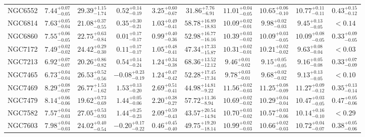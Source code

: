 \documentclass[onecolumn]{mn2e}
\begin{document}
\begin{landscape}
{\begin{center}
\begin{longtable}{lccccccccc}
NGC6552 & $7.44_{-0.05}^{+0.07}$ & $29.39_{-1.74}^{+1.15}$ & $0.52_{-0.19}^{+0.14}$ & $3.25_{-0.67}^{+0.60}$ &$31.86_{-6.91}^{+7.76}$ & $11.01_{-0.05}^{+0.04}$ & $10.65_{-0.10}^{+0.06}$ & $10.77_{-0.11}^{+0.11}$ & $0.43_{-0.12}^{+0.15}$ \\
NGC6814 & $7.63_{-0.04}^{+0.05}$ & $21.08_{-0.55}^{+0.37}$ & $0.35_{-0.21}^{+0.30}$ & $1.03_{-0.41}^{+0.49}$ &$58.78_{-18.83}^{+16.89}$ & $10.09_{-0.01}^{+0.02}$ & $9.98_{-0.03}^{+0.02}$ & $9.45_{-0.05}^{+0.13}$ & $<0.14$ \\
NGC6860 & $7.55_{-0.05}^{+0.06}$ & $22.75_{-0.84}^{+0.63}$ & $0.01_{-0.17}^{+0.17}$ & $0.99_{-0.36}^{+0.40}$ &$52.98_{-16.16}^{+16.77}$ & $10.39_{-0.02}^{+0.03}$ & $10.09_{-0.05}^{+0.03}$ & $10.09_{-0.05}^{+0.08}$ & $0.33_{-0.05}^{+0.09}$ \\
NGC7172 & $7.49_{-0.02}^{+0.02}$ & $24.42_{-0.30}^{+0.29}$ & $0.11_{-0.17}^{+0.17}$ & $1.05_{-0.41}^{+0.48}$ &$47.34_{-15.87}^{+17.33}$ & $10.31_{-0.01}^{+0.02}$ & $10.21_{-0.02}^{+0.02}$ & $9.63_{-0.04}^{+0.08}$ & $<0.03$ \\
NGC7213 & $6.92_{-0.07}^{+0.07}$ & $20.26_{-0.82}^{+0.86}$ & $0.54_{-0.24}^{+0.14}$ & $1.24_{-0.38}^{+0.34}$ &$68.36_{-12.12}^{+13.52}$ & $9.46_{-0.02}^{+0.01}$ & $9.15_{-0.05}^{+0.05}$ & $9.16_{-0.08}^{+0.05}$ & $0.33_{-0.09}^{+0.07}$ \\
NGC7465 & $6.73_{-0.04}^{+0.04}$ & $26.53_{-0.56}^{+0.52}$ & $-0.08_{-0.19}^{+0.23}$ & $1.24_{-0.42}^{+0.47}$ &$52.28_{-17.34}^{+17.45}$ & $9.78_{-0.01}^{+0.03}$ & $9.68_{-0.02}^{+0.02}$ & $9.13_{-0.05}^{+0.13}$ & $<0.10$ \\
NGC7469 & $8.29_{-0.07}^{+0.08}$ & $26.77_{-1.62}^{+1.53}$ & $1.53_{-0.20}^{+0.13}$ & $2.69_{-0.41}^{+0.51}$ &$44.98_{-9.22}^{+14.81}$ & $11.56_{-0.03}^{+0.02}$ & $11.25_{-0.09}^{+0.08}$ & $11.27_{-0.12}^{+0.09}$ & $0.35_{-0.14}^{+0.13}$ \\
NGC7479 & $8.14_{-0.06}^{+0.06}$ & $19.62_{-0.69}^{+0.73}$ & $1.44_{-0.06}^{+0.05}$ & $2.20_{-0.27}^{+0.38}$ &$57.72_{-8.94}^{+11.36}$ & $10.69_{-0.02}^{+0.02}$ & $10.29_{-0.04}^{+0.04}$ & $10.47_{-0.05}^{+0.03}$ & $0.47_{-0.06}^{+0.05}$ \\
NGC7582 & $7.57_{-0.03}^{+0.04}$ & $27.05_{-0.93}^{+0.53}$ & $1.44_{-0.23}^{+0.25}$ & $2.09_{-0.43}^{+0.59}$ &$43.57_{-14.94}^{+20.54}$ & $10.70_{-0.02}^{+0.03}$ & $10.57_{-0.06}^{+0.03}$ & $10.14_{-0.10}^{+0.16}$ & $<0.29$ \\
NGC7603 & $7.98_{-0.03}^{+0.04}$ & $24.02_{-0.54}^{+0.40}$ & $-0.20_{-0.22}^{+0.17}$ & $0.46_{-0.40}^{+0.45}$ &$49.75_{-18.14}^{+19.20}$ & $10.99_{-0.03}^{+0.02}$ & $10.66_{-0.03}^{+0.02}$ & $10.72_{-0.07}^{+0.04}$ & $0.38_{-0.06}^{+0.05}$ \\

\end{longtable}
\end{center}}
\end{landscape}
\end{document}
